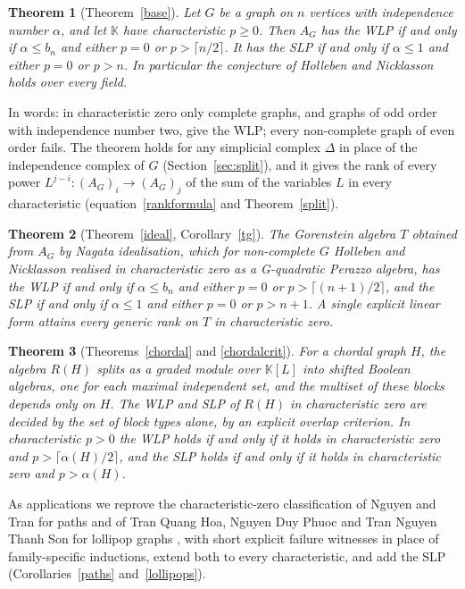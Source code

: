 \documentclass[11pt,a4paper]{article}
\newtheorem{maintheorem}{Theorem}
\theoremstyle{definition}
\newcommand{\kk}{\mathbb K}
\begin{document}
\begin{maintheorem}[Theorem~\ref{base}]\label{thmA}
Let $G$ be a graph on $n$ vertices with independence number $\alpha$, and let $\kk$ have characteristic $p\ge0$. Then $A_G$ has the WLP if and only if $\alpha\le b_n$ and either $p=0$ or $p>\lceil n/2\rceil$. It has the SLP if and only if $\alpha\le1$ and either $p=0$ or $p>n$. In particular the conjecture of Holleben and Nicklasson holds over every field.
\end{maintheorem}

In words: in characteristic zero only complete graphs, and graphs of odd order with independence number two, give the WLP; every non-complete graph of even order fails. The theorem holds for any simplicial complex $\Delta$ in place of the independence complex of $G$ (Section~\ref{sec:split}), and it gives the rank of every power $L^{j-i}:(A_G)_i\to(A_G)_j$ of the sum of the variables $L$ in every characteristic (equation~\eqref{rankformula} and Theorem~\ref{split}).

\begin{maintheorem}[Theorem~\ref{ideal}, Corollary~\ref{tg}]\label{thmB}
The Gorenstein algebra $T$ obtained from $A_G$ by Nagata idealisation, which for non-complete $G$ Holleben and Nicklasson realised in characteristic zero as a G-quadratic Perazzo algebra, has the WLP if and only if $\alpha\le b_n$ and either $p=0$ or $p>\lceil (n+1)/2\rceil$, and the SLP if and only if $\alpha\le1$ and either $p=0$ or $p>n+1$. A single explicit linear form attains every generic rank on $T$ in characteristic zero.
\end{maintheorem}

\begin{maintheorem}[Theorems~\ref{chordal} and \ref{chordalcrit}]\label{thmC}
For a chordal graph $H$, the algebra $R(H)$ splits as a graded module over $\kk[L]$ into shifted Boolean algebras, one for each maximal independent set, and the multiset of these blocks depends only on $H$. The WLP and SLP of $R(H)$ in characteristic zero are decided by the set of block types alone, by an explicit overlap criterion. In characteristic $p>0$ the WLP holds if and only if it holds in characteristic zero and $p>\lceil\alpha(H)/2\rceil$, and the SLP holds if and only if it holds in characteristic zero and $p>\alpha(H)$.
\end{maintheorem}

As applications we reprove the characteristic-zero classification of Nguyen and Tran for paths \cite{NT} and of Tran Quang Hoa, Nguyen Duy Phuoc and Tran Nguyen Thanh Son for lollipop graphs \cite{TPS}, with short explicit failure witnesses in place of family-specific inductions, extend both to every characteristic, and add the SLP (Corollaries~\ref{paths} and~\ref{lollipops}).
\end{document}

